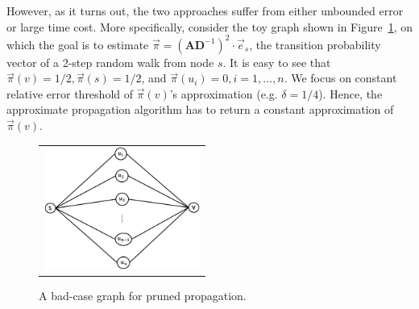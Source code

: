 However, as it turns out, the two approaches suffer from either unbounded error or large time cost. More specifically, consider the toy graph shown in Figure~\ref{fig:special-case}, on which the goal is to estimate $\vec{\pi}=\left(\mathbf{A}\mathbf{D}^{-1} \right)^2 \cdot \vec{e}_s $, the transition probability vector of a 2-step random walk from node $s$. It is easy to see that $\vec{\pi}(v)=1/2, \vec{\pi}(s) = 1/2$, and $\vec{\pi}(u_i)=0, i=1,\ldots, n$. 
We focus on constant relative error threshold of $\vec{\pi}(v)$'s approximation (e.g. $\delta = 1/4$). Hence, the approximate propagation algorithm has to return a constant approximation of $\vec{\pi}(v)$. 
\begin{figure}[t]%
	\begin{small}
		\centering
		\begin{tabular}{c}
			\includegraphics[height=40mm]{./Figs/img_special-case.eps} 
		\end{tabular}
		\vspace{-5mm}
		\caption{A bad-case graph for pruned propagation.} 
		\label{fig:special-case}
		\vspace{-5mm}
	\end{small}
	\vspace{-2mm}
\end{figure}
